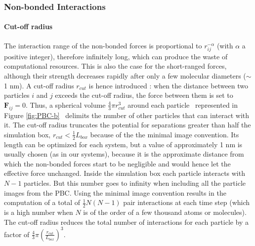 \subsubsection{Non-bonded Interactions}

\paragraph{\label{sub:Cut-off-Radius}Cut-off radius}

The interaction range of the non-bonded forces is proportional to
$r_{ij}^{-\alpha}$ (with $\alpha$ a positive integer), therefore
infinitely long, which can produce the waste of computational resources.
This is also the case for the short-ranged forces, although their
strength decreases rapidly after only a few molecular diameters ($\sim$1
nm). A cut-off radius $r_{cut}$ is hence introduced \cite{fangohr:2000,frenkel:2002}:
when the distance between two particles $i$ and $j$ exceeds the
cut-off radius, the force between them is set to $\mathbf{F}_{ij}=0$.
Thus, a spherical volume $\frac{4}{3}\pi r_{cut}^{3}$ around each
particle \textendash ~represented in Figure \ref{fig:PBC-b}~\textendash{}
delimits the number of other particles that can interact with it.
The cut-off radius truncates the potential for separations greater
than half the simulation box, $r_{cut}<\frac{1}{2}L_{box}$ because
of the the minimal image convention. Its length can be optimized for
each system, but a value of approximately 1 nm is usually chosen (as
in our systems), because it is the approximate distance from which
the non-bonded forces start to be negligible and would hence let the
effective force unchanged. Inside the simulation box each particle interacts with $N-1$ particles.
But this number goes to infinity when including all the particle images
from the PBC. Using the minimal image convention results in the computation
of a total of $\frac{1}{2}N(N-1)$ pair interactions at each time
step (which is a high number when $N$ is of the order of a few thousand
atoms or molecules). The cut-off radius reduces the total number of
interactions for each particle by a factor of $\frac{4}{3}\pi\left(\frac{r_{cut}}{L_{box}}\right)^{3}$.